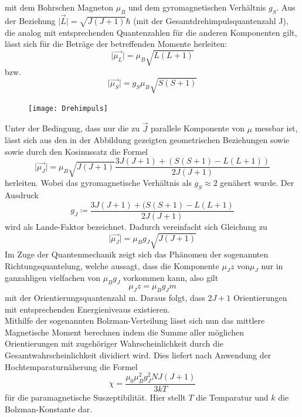 mit dem Bohrschen Magneton $\mu_B$ und dem gyromagnetischen Verhältnis $g_S$. Aus der Beziehung $\lvert \vec{L} \rvert=\sqrt{J(J+1)}\hbar$ (mit der Gesamtdrehimpulsquantenzahl J), die analog mit entsprechenden Quantenzahlen für die anderen Komponenten gilt, lässt sich für die Beträge der betreffenden Momente herleiten:
\begin{equation*}
\lvert \vec{\mu_L}\rvert=\mu_B\sqrt{L(L+1)}
\end{equation*}
bzw.
\begin{equation*}
\lvert \vec{\mu_S}\rvert=g_S\mu_B\sqrt{S(S+1)}
\end{equation*}
\begin{figure}[h]
    \centering
    \texttt{[image: Drehimpuls]}
    \label{Drehimpuls}
  \end{figure}
Unter der Bedingung, dass nur die zu $\vec{J}$ parallele Komponente von $\mu$ messbar ist, lässt sich aus den in der Abbildung gezeigten geometrischen Beziehungen sowie sowie durch den Kosinussatz die Formel
\begin{equation*}
\lvert \vec{\mu_J} \rvert=\mu_B\sqrt{J(J+1)}\frac{3J(J+1)+(S(S+1)-L(L+1))}{2J(J+1)}
\end{equation*}
herleiten. Wobei das gyromagnetische Verhältnis als $g_S\approx2$ genähert wurde. Der Ausdruck
\begin{equation}
g_J\coloneq\frac{3J(J+1)+(S(S+1)-L(L+1)}{2J(J+1)}
\end{equation}
wird als Lande-Faktor bezeichnet. Dadurch vereinfacht sich Gleichung zu
\begin{equation}
\lvert \vec{\mu_J} \rvert=\mu_Bg_J\sqrt{J(J+1)}
\end{equation}
Im Zuge der Quantenmechanik zeigt sich das Phänomen der sogenannten Richtungsquantelung, welche aussagt, dass die Komponente $\mu_Jz$ von$\mu_J$ nur in ganzahligen vielfachen von $\mu_Bg_J$ vorkommen kann, also gilt
\begin{equation*}
\mu_Jz=\mu_Bg_Jm
\end{equation*}
mit der Orientierungsquantenzahl m. Daraus folgt, dass $2J+1$ Orientierungen mit entsprechenden Energieniveaus existieren. \\ 
Mithilfe der sogenannten Bolzman-Verteilung lässt sich nun das mittlere Magnetische Moment berechnen indem die Summe aller möglichen Orientierungen mit zugehöriger Wahrscheinlichkeit durch die Gesamtwahrscheinlichkeit dividiert wird. Dies liefert nach Anwendung der Hochtemparaturnäherung die Formel 
\begin{equation}
\chi=\frac{\mu_0\mu_B^2g_J^2NJ(J+1)}{3kT}
\end{equation}
für die paramagnetische Suszeptibilität. Hier stellt $T$ die Temparatur und $k$ die Bolzman-Konstante dar.
